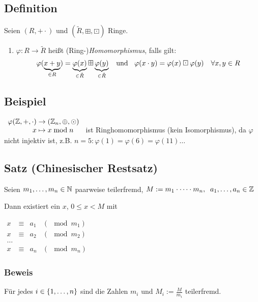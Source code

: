 \subsection[Definition: Homomorphismus, Isomorphismus]{Definition}

Seien $(R, + \cdot)$ und $(\tilde{R}, \boxplus, \boxdot)$ Ringe.

{\renewcommand{\labelenumi}{(\roman{enumi})}
\begin{enumerate}
	\item
	$\varphi: R \to \tilde{R}$ heißt (Ring-)\emph{Homomorphismus}, falls gilt:
	\[\varphi(\underbrace{x+y}_{\in R}) = \underbrace{\varphi(x)}_{\in \tilde{R}} \boxplus \underbrace{\varphi(y)}_{\in \tilde{R}}
	\text{\;\; und \;\;}
	\varphi(x \cdot y) = \varphi(x) \boxdot \varphi(y) \quad \forall x, y \in R\]
	
\end{enumerate}}

\subsection{Beispiel}

$\begin{array}[b]{r@{\;}c@{\;}l}
	\varphi(\Z, +, \cdot) &\to&  (\Z_n, \oplus, \odot) \\
	x	&\mapsto& x \mod n 
\end{array}$
ist Ringhomomorphismus (kein Isomorphismus), da $\varphi$ nicht injektiv ist, z.B. $n=5: \varphi(1)= \varphi(6) = \varphi(11) \dots$

\subsection[Satz: Chinesischer Restsatz]{Satz (Chinesischer Restsatz)} \label{chin.restsatz}

Seien $m_1, \dots, m_n \in \mathbb{N}$ paarweise teilerfremd,
$M := m_1 \cdot \dots \cdot m_n, \;\; a_1, \dots, a_n \in \mathbb{Z}$

Dann existiert ein $x$, $0 \leq x < M$ mit 

$\begin{array}{lcll}
x &\equiv& a_1	& (\mod m_1) \\
x &\equiv& a_2	& (\mod m_2) \\
\dots \\
x &\equiv& a_n	& (\mod m_n)
\end{array}$

\subsubsection*{Beweis}
Für jedes $i \in \left\{1, \dots, n\right\}$ sind die Zahlen $m_i$ und $M_i := \frac{M}{m_i}$ teilerfremd.

